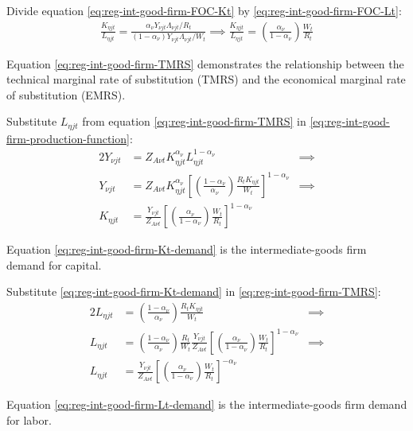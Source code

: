 \documentclass[
	thesis.tex
	]{subfiles}
\begin{document}
Divide equation \ref{eq:reg-int-good-firm-FOC-Kt} by \ref{eq:reg-int-good-firm-FOC-Lt}:
\begin{align}
	\frac{K_{\eta jt}}{L_{\eta jt}} = \frac{{\alpha_\nu} Y_{\nu jt} \Lambda_{\nu jt} /R_t}{(1-{\alpha_\nu}) Y_{\nu jt} \Lambda_{\nu jt} /W_t} \implies
	\frac{K_{\eta jt}}{L_{\eta jt}} = \left( \frac{{\alpha_\nu}}{1-{\alpha_\nu}} \right) \frac{W_t}{R_t} \label{eq:reg-int-good-firm-TMRS}
\end{align}

Equation \ref{eq:reg-int-good-firm-TMRS} demonstrates the relationship between the technical marginal rate of substitution (TMRS) and the economical marginal rate of substitution (EMRS). 

Substitute $L_{\eta jt}$ from equation \ref{eq:reg-int-good-firm-TMRS} in \ref{eq:reg-int-good-firm-production-function}:
\begin{alignat}{2}
	Y_{\nu jt} & = Z_{A\nu t} K_{\eta jt}^{\alpha_\nu} L_{\eta jt}^{1-{\alpha_\nu}} &\implies \nonumber \\
	Y_{\nu jt} & = Z_{A\nu t} K_{\eta jt}^{\alpha_\nu} \left[ \left( \frac{1-{\alpha_\nu}}{{\alpha_\nu}} \right) \frac{R_t K_{\eta jt}}{W_t} \right]^{1-{\alpha_\nu}} &\implies \nonumber \\
	K_{\eta jt} & = \frac{Y_{\nu jt}}{Z_{A\nu t}} \left[ \left( \frac{{\alpha_\nu}}{1-{\alpha_\nu}} \right) \frac{W_t}{R_t}\right]^{1-{\alpha_\nu}} \label{eq:reg-int-good-firm-Kt-demand}
\end{alignat}

Equation \ref{eq:reg-int-good-firm-Kt-demand} is the intermediate-goods firm demand for capital. 

Substitute \ref{eq:reg-int-good-firm-Kt-demand} in \ref{eq:reg-int-good-firm-TMRS}:
\begin{alignat}{2}
	L_{\eta jt} & = \left( \frac{1-{\alpha_\nu}}{{\alpha_\nu}} \right) \frac{R_t K_{\eta jt}}{W_t} &\implies \nonumber \\
	L_{\eta jt} & = \left( \frac{1-{\alpha_\nu}}{{\alpha_\nu}} \right) \frac{R_t}{W_t} \frac{Y_{\nu jt}}{Z_{A\nu t}} \left[ \left( \frac{{\alpha_\nu}}{1-{\alpha_\nu}} \right) \frac{W_t}{R_t}\right]^{1-{\alpha_\nu}} &\implies \nonumber \\
	L_{\eta jt} & = \frac{Y_{\nu jt}}{Z_{A\nu t}} \left[ \left( \frac{{\alpha_\nu}}{1-{\alpha_\nu}} \right) \frac{W_t}{R_t}\right]^{-{\alpha_\nu}} \label{eq:reg-int-good-firm-Lt-demand}
\end{alignat}

Equation \ref{eq:reg-int-good-firm-Lt-demand} is the intermediate-goods firm demand for labor.
\end{document}
